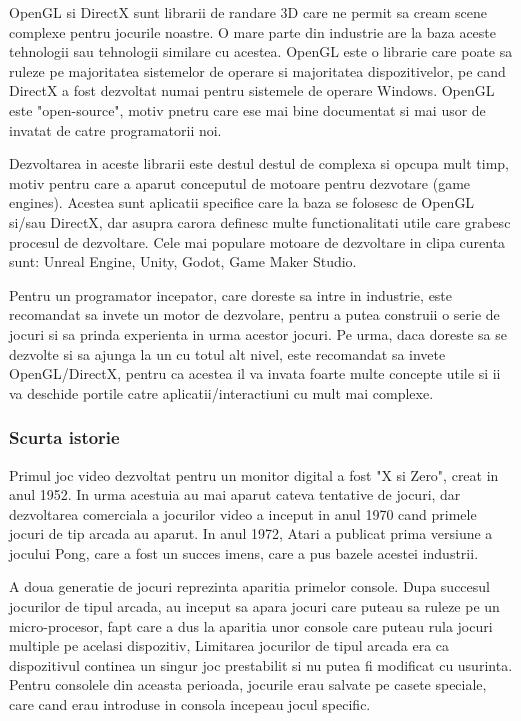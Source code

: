 \documentclass[12pt, a4paper]{article}
\begin{document}
	OpenGL si DirectX sunt librarii de randare 3D care ne permit sa cream scene complexe pentru jocurile noastre. O mare parte din industrie are la baza aceste tehnologii sau tehnologii similare cu acestea. OpenGL este o librarie care poate sa ruleze pe majoritatea sistemelor de operare si majoritatea dispozitivelor, pe cand DirectX a fost dezvoltat numai pentru sistemele de operare Windows. OpenGL este "open-source", motiv pnetru care ese mai bine documentat si mai usor de invatat de catre programatorii noi.
	\newline
	
	Dezvoltarea in aceste librarii este destul destul de complexa si opcupa mult timp, motiv pentru care a aparut conceputul de motoare pentru dezvotare (game engines). Acestea sunt aplicatii specifice care la baza se folosesc de OpenGL si/sau DirectX, dar asupra carora definesc multe functionalitati utile care grabesc procesul de dezvoltare. Cele mai populare motoare de dezvoltare in clipa curenta sunt: Unreal Engine, Unity, Godot, Game Maker Studio.
	\newline
	
	Pentru un programator incepator, care doreste sa intre in industrie, este recomandat sa invete un motor de dezvolare, pentru a putea construii o serie de jocuri si sa prinda experienta in urma acestor jocuri. Pe urma, daca doreste sa se dezvolte si sa ajunga la un cu totul alt nivel, este recomandat sa invete OpenGL/DirectX, pentru ca acestea il va invata foarte multe concepte utile si ii va deschide portile catre aplicatii/interactiuni cu mult mai complexe.
	
	
	
	
	\subsubsection{Scurta istorie}
	
	Primul joc video dezvoltat pentru un monitor digital a fost "X si Zero", creat in anul 1952. In urma acestuia au mai aparut cateva tentative de jocuri, dar dezvoltarea comerciala a jocurilor video a inceput in anul 1970 cand primele jocuri de tip arcada au aparut. In anul 1972, Atari a publicat prima versiune a jocului Pong, care a fost un succes imens, care a pus bazele acestei industrii.
	\newline
	
	A doua generatie de jocuri reprezinta aparitia primelor console. Dupa succesul jocurilor de tipul arcada, au inceput sa apara jocuri care puteau sa ruleze pe un micro-procesor, fapt care a dus la aparitia unor console care puteau rula jocuri multiple pe acelasi dispozitiv, Limitarea jocurilor de tipul arcada era ca dispozitivul continea un singur joc prestabilit si nu putea fi modificat cu usurinta. Pentru consolele din aceasta perioada, jocurile erau salvate pe casete speciale, care cand erau introduse in consola incepeau jocul specific.
	\newline
	
\end{document}
